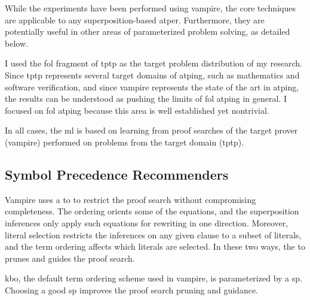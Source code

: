 While the experiments have been performed using \gls{vampire},
the core techniques are applicable to any \gls{superposition}-based \gls{atper}.
Furthermore, they are potentially useful in other areas of parameterized problem solving, as detailed below.

I used the \gls{fol} fragment of \gls{tptp} as the target problem distribution of my research.
Since \gls{tptp} represents several target domains of \gls{atping},
such as mathematics and software verification,
and since \gls{vampire} represents the state of the art in \gls{atping},
the results can be understood as pushing the limits of \gls{fol} \gls{atping} in general.
I focused on \gls{fol} \gls{atping} because this area is well established yet nontrivial.

In all cases, the \gls{ml} is based on learning from proof searches of the target prover (\gls{vampire}) performed on problems from the target domain (\gls{tptp}).

\subsection{Symbol Precedence Recommenders}
\label{sec:contrib:SymbolPrecedenceRecommenders}

Vampire uses a \gls{to} to restrict the proof search without compromising completeness.
The ordering orients some of the equations, and the superposition inferences only apply such equations for rewriting in one direction.
Moreover, literal selection restricts the inferences on any given clause to a subset of literals, and the term ordering affects which literals are selected.
In these two ways, the \gls{to} prunes and guides the proof search.

\Gls{kbo}, the default term ordering scheme used in \gls{vampire}, is parameterized by a \gls{sp}.
Choosing a good \gls{sp} improves the proof search pruning and guidance.

